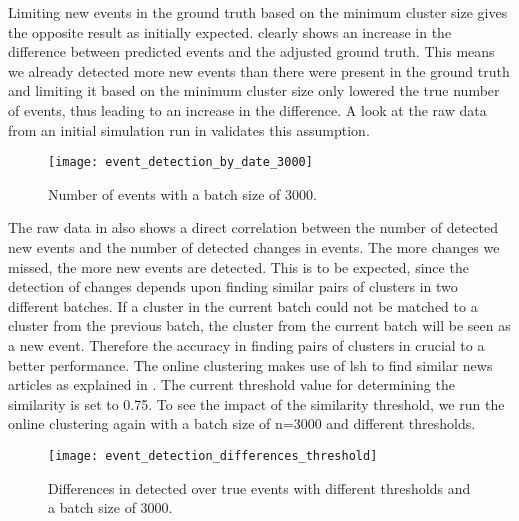 Limiting new events in the ground truth based on the minimum cluster size
gives the opposite result as initially expected.
 clearly shows
an increase in the difference between predicted events and the adjusted ground truth.
This means we already detected more new events than there were present in the ground truth
and limiting it based on the minimum cluster size only lowered the true number of events,
thus leading to an increase in the difference.
A look at the raw data from an initial simulation run in 
validates this assumption.

\begin{figure}[h]
    \centering
    \texttt{[image: event\_detection\_by\_date\_3000]}
    \caption{Number of events with a batch size of 3000.}
    \label{fig:event_detection_by_date_3000}
\end{figure}

The raw data in 
also shows a direct correlation between the number of detected new events and the number of detected changes in events.
The more changes we missed, the more new events are detected.
This is to be expected,
since the detection of changes depends upon finding similar pairs of clusters in two different batches.
If a cluster in the current batch could not be matched to a cluster from the previous batch,
the cluster from the current batch will be seen as a new event.
Therefore the accuracy in finding pairs of clusters in crucial to a better performance.
The online clustering makes use of \gls{lsh} to find similar news articles
as explained in .
The current threshold value for determining the similarity is set to 0.75.
To see the impact of the similarity threshold,
we run the online clustering again with a batch size of n=3000 and different thresholds.

\begin{figure}[h]
    \centering
    \texttt{[image: event\_detection\_differences\_threshold]}
    \caption{Differences in detected over true events with different thresholds and a batch size of 3000.}
    \label{fig:event_detection_differences_threshold}
\end{figure}


